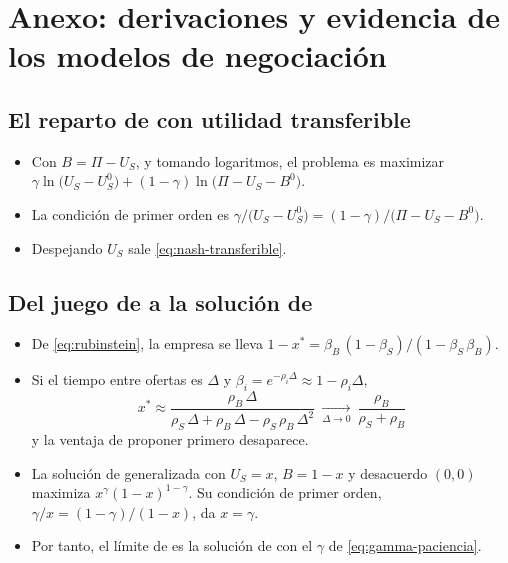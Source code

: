 \documentclass[11pt]{article}
\begin{document}
\clearpage
\appendix

\section{Anexo: derivaciones y evidencia\cortetitulo{} de los modelos de negociación}\label{anexo:contratos-eficientes}

\subsection{El reparto de  con utilidad transferible}\label{anexo:nash-transferible}

\begin{itemize}
\item Con $B=\Pi-U_S$, y tomando logaritmos, el problema es maximizar $\gamma\ln\big(U_S-U_S^0\big)+(1-\gamma)\ln\big(\Pi-U_S-B^0\big)$.
\item La condición de primer orden es $\gamma/\big(U_S-U_S^0\big)=(1-\gamma)/\big(\Pi-U_S-B^0\big)$.
\item Despejando $U_S$ sale \eqref{eq:nash-transferible}.\findemo
\end{itemize}

\subsection{Del juego de  a la solución de }\label{anexo:rubinstein-nash}

\begin{itemize}
\item De \eqref{eq:rubinstein}, la empresa se lleva $1-x^*=\beta_B\,(1-\beta_S)/(1-\beta_S\,\beta_B)$.
\item Si el tiempo entre ofertas es $\Delta$ y $\beta_i=e^{-\rho_i\Delta}\approx 1-\rho_i\Delta$,
  $$x^*\approx\frac{\rho_B\,\Delta}{\rho_S\,\Delta+\rho_B\,\Delta-\rho_S\,\rho_B\,\Delta^2}\ \xrightarrow[\Delta\to 0]{}\ \frac{\rho_B}{\rho_S+\rho_B}$$
  y la ventaja de proponer primero desaparece.
\item La solución de  generalizada con $U_S=x$, $B=1-x$ y desacuerdo $(0,0)$ maximiza $x^{\gamma}(1-x)^{1-\gamma}$. Su condición de primer orden, $\gamma/x=(1-\gamma)/(1-x)$, da $x=\gamma$.
\item Por tanto, el límite de  es la solución de  con el $\gamma$ de \eqref{eq:gamma-paciencia}.\findemo
\end{itemize}
\end{document}
